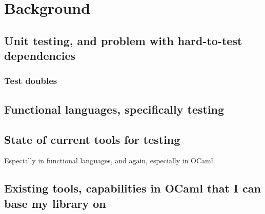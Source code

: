 \chapter{Background}
\label{background}

\section{Unit testing, and problem with hard-to-test dependencies}

\subsection{Test doubles}
\label{testdoubles}


\section{Functional languages, specifically testing}

\section{State of current tools for testing}

Especially in functional languages, and again, especially in OCaml.

\section{Existing tools, capabilities in OCaml that I can base my library on}

